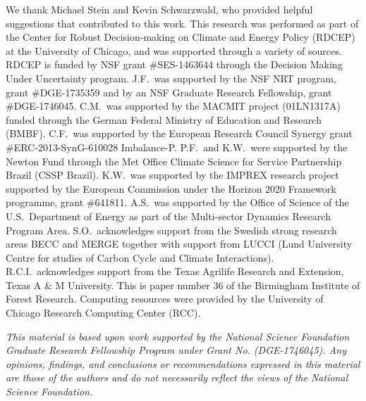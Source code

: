 \documentclass[gmdd]{copernicus} %
\begin{document}



\begin{acknowledgements}
We thank Michael Stein and Kevin Schwarzwald, who provided helpful suggestions that contributed to this work. 
This research was performed as part of the Center for Robust Decision-making on Climate and Energy Policy (RDCEP) at the University of Chicago, and was supported through a variety of sources. 
RDCEP is funded by NSF grant \#SES-1463644 through the Decision Making Under Uncertainty program. 
J.F.\ was supported by the NSF NRT program, grant \#DGE-1735359 and by an NSF Graduate Research Fellowship, grant \#DGE-1746045. 
C.M.\ was supported by the MACMIT project (01LN1317A) funded through the German Federal Ministry of Education and Research (BMBF). 
C.F.\ was supported by the European Research Council Synergy grant \#ERC-2013-SynG-610028 Imbalance-P. 
P.F.\ and K.W.\ were supported  by the Newton Fund through the Met Office Climate Science for Service Partnership Brazil (CSSP Brazil). 
K.W.\ was supported by the IMPREX research project supported by the European Commission under the Horizon 2020 Framework programme, grant \#641811. 
A.S.\ was supported by the Office of Science of the U.S.\ Department of Energy as part of the Multi-sector Dynamics Research Program Area. 
S.O.\ acknowledges support from the Swedish strong research areas BECC and MERGE together with support from LUCCI (Lund University Centre for studies of Carbon Cycle and Climate Interactions). 
R.C.I.\ acknowledges support from the Texas Agrilife Research and Extension, Texas A \& M University. 
This is paper number 36 of the Birmingham Institute of Forest Research. 
Computing resources were provided by the University of Chicago Research Computing Center (RCC).

\smallskip
\textit{This material is based upon work supported by the National Science Foundation Graduate Research Fellowship Program under Grant No. (DGE-1746045). 
Any opinions, findings, and conclusions or recommendations expressed in this material are those of the authors and do not necessarily reflect the views of the National Science Foundation.}
\end{acknowledgements}



\end{document}
